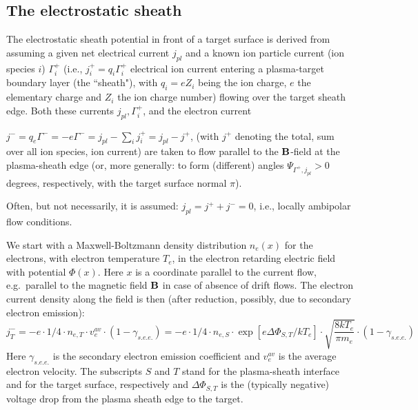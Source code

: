 \subsection{The electrostatic sheath} \label{sec1.4.1}

The electrostatic sheath potential in front of a target surface is derived from
assuming a given net electrical current $j_{pl}$ and a known ion particle
current (ion species $i$) $\Gamma^+_i$ (i.e., $j^+_i = q_i \Gamma^+_i$
electrical ion current entering a plasma-target boundary layer (the ``sheath"),
with $q_i=eZ_i$ being the ion charge, $e$ the elementary charge and $Z_i$ the
ion charge number) flowing over the target sheath edge.
Both these currents $j_{pl}, \Gamma^+_i$, and the electron current

$j^-=q_e\Gamma^- = -e\Gamma^- = j_{pl} - \sum_i j^+_i = j_{pl} -  j^+$, (with
$j^+$ denoting the total, sum over all ion species, ion current) are taken to
flow parallel to the $\mathbf{B}$-field at the plasma-sheath edge (or, more generally:
to form (different) angles $\Psi_{\Gamma^+,j_{pl}} > 0$ degrees, respectively,
with the target surface normal $\pi$).

Often, but not necessarily, it is assumed: $j_{pl} = j^+ + j^- = 0$, i.e.,
locally ambipolar flow conditions.

We start with a Maxwell-Boltzmann density distribution $n_e(x)$ for the
electrons, with electron temperature $T_e$, in the electron retarding electric
field with potential $\Phi(x)$.
Here $x$ is a coordinate parallel to the current flow, e.g.\ parallel to the
magnetic field $\mathbf{B}$ in case of absence of drift flows.
The electron current density along the field is then (after reduction,
possibly, due to secondary electron emission):
\begin{displaymath}
  j^-_T = -e \cdot 1/4 \cdot n_{e,T} \cdot v_e^{av} \cdot
  (1-\gamma_{s.e.e.}) = -e \cdot 1/4  \cdot n_{e,S} \cdot \exp[e
    \Delta\Phi_{S,T}/kT_e] \cdot \sqrt{\frac{8 kT_e}{\pi m_e}} \cdot
  (1-\gamma_{s.e.e.})
\end{displaymath}
Here $\gamma_{s.e.e.
  }
$ is the secondary electron emission coefficient and $v_e^{av}$ is the average
electron velocity.
The subscripts $S$ and $T$ stand for the plasma-sheath interface and for the
target surface, respectively and $ \Delta\Phi_{S,T}$ is the (typically
negative) voltage drop from the plasma sheath edge to the target.


